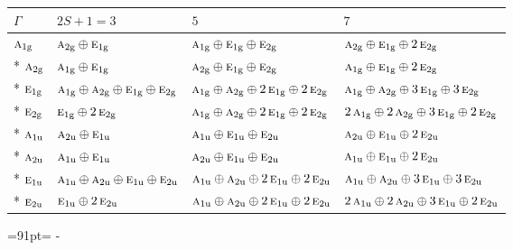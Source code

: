 \documentclass[10pt,a4paper]{article}
\newcommand{\needspace}[1]{\par\penalty-100\begingroup\dimen0=#1\relax\dimen2=\pagegoal
  \advance\dimen2-\pagetotal\ifdim\dimen0>\dimen2\relax\ifdim\dimen2>0pt\vfil\break\fi\fi
  \endgroup}
\numberwithin{equation}{section}
\newcommand{\irr}[1]{\text{\normalfont\scshape #1}}
\newcommand{\ptag}[1]{\mathrm{#1}}
\begin{document}
{\small\setlength{\tabcolsep}{3pt}\begin{longtable}{@{}llll@{}}\toprule
$\Gamma$ & $2S + 1 = 3$ & $5$ & $7$\\\midrule\endhead
\bottomrule\endfoot\endlastfoot
$\irr{a}_{1\ptag{g}}$ & $\irr{a}_{2\ptag{g}}\oplus \irr{e}_{1\ptag{g}}$ & $\irr{a}_{1\ptag{g}}\oplus \irr{e}_{1\ptag{g}}\oplus \irr{e}_{2\ptag{g}}$ & $\irr{a}_{2\ptag{g}}\oplus \irr{e}_{1\ptag{g}}\oplus 2\,\irr{e}_{2\ptag{g}}$\\*
$\irr{a}_{2\ptag{g}}$ & $\irr{a}_{1\ptag{g}}\oplus \irr{e}_{1\ptag{g}}$ & $\irr{a}_{2\ptag{g}}\oplus \irr{e}_{1\ptag{g}}\oplus \irr{e}_{2\ptag{g}}$ & $\irr{a}_{1\ptag{g}}\oplus \irr{e}_{1\ptag{g}}\oplus 2\,\irr{e}_{2\ptag{g}}$\\*
$\irr{e}_{1\ptag{g}}$ & $\irr{a}_{1\ptag{g}}\oplus \irr{a}_{2\ptag{g}}\oplus \irr{e}_{1\ptag{g}}\oplus \irr{e}_{2\ptag{g}}$ & $\irr{a}_{1\ptag{g}}\oplus \irr{a}_{2\ptag{g}}\oplus 2\,\irr{e}_{1\ptag{g}}\oplus 2\,\irr{e}_{2\ptag{g}}$ & $\irr{a}_{1\ptag{g}}\oplus \irr{a}_{2\ptag{g}}\oplus 3\,\irr{e}_{1\ptag{g}}\oplus 3\,\irr{e}_{2\ptag{g}}$\\*
$\irr{e}_{2\ptag{g}}$ & $\irr{e}_{1\ptag{g}}\oplus 2\,\irr{e}_{2\ptag{g}}$ & $\irr{a}_{1\ptag{g}}\oplus \irr{a}_{2\ptag{g}}\oplus 2\,\irr{e}_{1\ptag{g}}\oplus 2\,\irr{e}_{2\ptag{g}}$ & $2\,\irr{a}_{1\ptag{g}}\oplus 2\,\irr{a}_{2\ptag{g}}\oplus 3\,\irr{e}_{1\ptag{g}}\oplus 2\,\irr{e}_{2\ptag{g}}$\\*
$\irr{a}_{1\ptag{u}}$ & $\irr{a}_{2\ptag{u}}\oplus \irr{e}_{1\ptag{u}}$ & $\irr{a}_{1\ptag{u}}\oplus \irr{e}_{1\ptag{u}}\oplus \irr{e}_{2\ptag{u}}$ & $\irr{a}_{2\ptag{u}}\oplus \irr{e}_{1\ptag{u}}\oplus 2\,\irr{e}_{2\ptag{u}}$\\*
$\irr{a}_{2\ptag{u}}$ & $\irr{a}_{1\ptag{u}}\oplus \irr{e}_{1\ptag{u}}$ & $\irr{a}_{2\ptag{u}}\oplus \irr{e}_{1\ptag{u}}\oplus \irr{e}_{2\ptag{u}}$ & $\irr{a}_{1\ptag{u}}\oplus \irr{e}_{1\ptag{u}}\oplus 2\,\irr{e}_{2\ptag{u}}$\\*
$\irr{e}_{1\ptag{u}}$ & $\irr{a}_{1\ptag{u}}\oplus \irr{a}_{2\ptag{u}}\oplus \irr{e}_{1\ptag{u}}\oplus \irr{e}_{2\ptag{u}}$ & $\irr{a}_{1\ptag{u}}\oplus \irr{a}_{2\ptag{u}}\oplus 2\,\irr{e}_{1\ptag{u}}\oplus 2\,\irr{e}_{2\ptag{u}}$ & $\irr{a}_{1\ptag{u}}\oplus \irr{a}_{2\ptag{u}}\oplus 3\,\irr{e}_{1\ptag{u}}\oplus 3\,\irr{e}_{2\ptag{u}}$\\*
$\irr{e}_{2\ptag{u}}$ & $\irr{e}_{1\ptag{u}}\oplus 2\,\irr{e}_{2\ptag{u}}$ & $\irr{a}_{1\ptag{u}}\oplus \irr{a}_{2\ptag{u}}\oplus 2\,\irr{e}_{1\ptag{u}}\oplus 2\,\irr{e}_{2\ptag{u}}$ & $2\,\irr{a}_{1\ptag{u}}\oplus 2\,\irr{a}_{2\ptag{u}}\oplus 3\,\irr{e}_{1\ptag{u}}\oplus 2\,\irr{e}_{2\ptag{u}}$\\
\bottomrule\end{longtable}}
\needspace{91pt}
\end{document}
